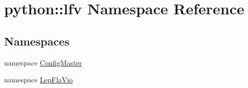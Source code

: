 \hypertarget{namespacepython_1_1lfv}{
\section{python::lfv Namespace Reference}
\label{namespacepython_1_1lfv}
}
\subsection*{Namespaces}
\begin{DoxyCompactItemize}
\item 
namespace \hyperlink{namespacepython_1_1lfv_1_1ConfigMaster}{ConfigMaster}
\item 
namespace \hyperlink{namespacepython_1_1lfv_1_1LepFlaVio}{LepFlaVio}
\end{DoxyCompactItemize}
